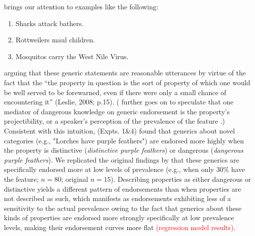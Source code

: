 \documentclass[floatsintext, 11pt, doc]{apa6}
\newcommand{\red}[1]{\textcolor{Red}{#1}}
\begin{document}
 brings our attention to examples like the following:

\begin{enumerate}
\item Sharks attack bathers.
\item Rottweilers maul children. 
\item Mosquitos carry the West Nile Virus.
\end{enumerate}

\noindent arguing that these generic statements are reasonable utterances by virtue of the fact that the ``the property in question is the sort of property of which one would be well served to be forewarned, even if there were only a small chance of encountering it'' (Leslie, 2008; p.15).
( further goes on to speculate that one mediator of dangerous knowledge on generic endorsement is the property's projectibility, or a speaker's perception of the prevalence of the feature \cite{Rothbart1978}.)
Consistent with this intuition,   (Expts. 1\&4) found that generics about novel categories (e.g., "Lorches have purple feathers") are endorsed more highly when the property is distinctive (\emph{distinctive purple feathers}) or dangerous (\emph{dangerous purple feathers}).
We replicated the original findings by  that these generics are specifically endorsed more at low levels of prevalence (e.g., when only 30\% have the feature; $n=80$; original $n=15$). 
Describing properties as either dangerous or distinctive yields a different pattern of endorsements than when properties are not described as such, which manifests as endorsements exhibiting less of a sensitivity to the actual prevalence owing to the fact that generics about these kinds of properties are endorsed more strongly specifically at low prevalence levels, making their endorsement curves more flat \red{(regression model results)}. 
\end{document}

